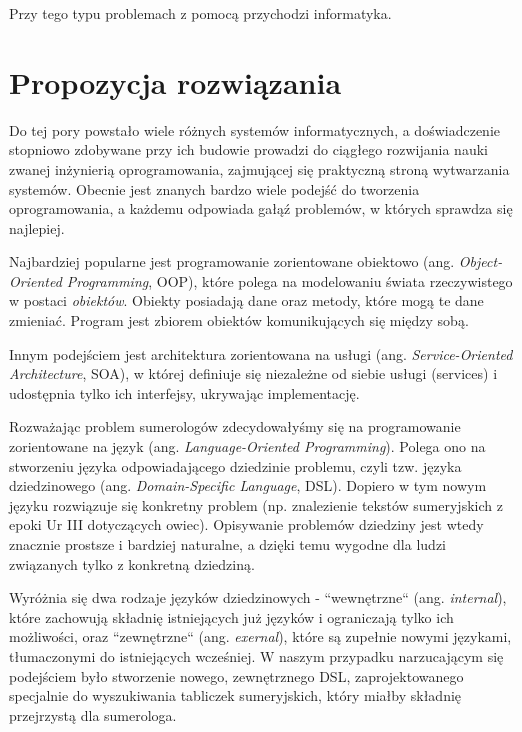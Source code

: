 Przy tego typu problemach z pomocą przychodzi informatyka. 

\section*{Propozycja rozwiązania}
Do tej pory powstało wiele różnych systemów informatycznych, a doświadczenie stopniowo zdobywane przy ich budowie prowadzi do 
ciągłego rozwijania nauki zwanej inżynierią oprogramowania, zajmującej się praktyczną stroną wytwarzania systemów. Obecnie jest 
znanych bardzo wiele podejść do tworzenia oprogramowania, a każdemu odpowiada gałąź problemów, w których sprawdza się najlepiej. 

Najbardziej popularne jest programowanie zorientowane obiektowo (ang. \emph{Object-Oriented Programming}, OOP), które polega na modelowaniu 
świata rzeczywistego w postaci \textit{obiektów}. Obiekty posiadają dane oraz metody, które mogą te dane zmieniać. Program jest zbiorem 
obiektów komunikujących się między sobą. 

Innym podejściem jest architektura zorientowana na usługi (ang. \emph{Service-Oriented Architecture}, SOA), w której definiuje się 
niezależne od siebie usługi (services) i udostępnia tylko ich interfejsy, ukrywając implementację.

Rozważając problem sumerologów zdecydowałyśmy się na programowanie zorientowane na język (ang. \emph{Language-Oriented Programming}). 
Polega ono na stworzeniu języka odpowiadającego dziedzinie problemu, czyli tzw. języka dziedzinowego (ang. \emph{Domain-Specific Language},
 DSL). Dopiero w tym nowym języku rozwiązuje się konkretny problem (np. znalezienie tekstów sumeryjskich z epoki Ur III dotyczących owiec). 
Opisywanie problemów dziedziny jest wtedy znacznie prostsze i bardziej naturalne, a dzięki temu wygodne dla ludzi związanych tylko z 
konkretną dziedziną. 

Wyróżnia się dwa rodzaje języków dziedzinowych - ``wewnętrzne`` (ang. \emph{internal}), które zachowują składnię istniejących już języków 
i ograniczają tylko ich możliwości, oraz ``zewnętrzne`` (ang. \emph{exernal}), które są zupełnie nowymi językami, tłumaczonymi do 
istniejących wcześniej. W naszym przypadku narzucającym się podejściem było stworzenie nowego, zewnętrznego DSL, zaprojektowanego 
specjalnie do wyszukiwania tabliczek sumeryjskich, który miałby składnię przejrzystą dla sumerologa. 

